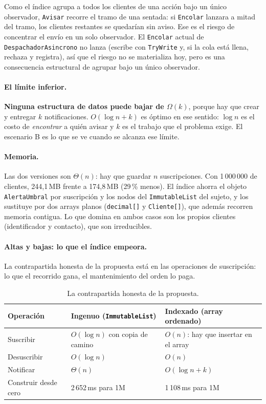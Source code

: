 Como el índice agrupa a todos los clientes de una acción bajo un único observador,
\texttt{Avisar} recorre el tramo de una sentada: si \texttt{Encolar} lanzara a mitad del
tramo, los clientes restantes se quedarían sin aviso. Ese es el riesgo de concentrar el
envío en un solo observador. El \texttt{Encolar} actual de
\texttt{DespachadorAsincrono} no lanza (escribe con \texttt{TryWrite} y, si la cola está
llena, rechaza y registra), así que el riesgo no se materializa hoy, pero es una
consecuencia estructural de agrupar bajo un único observador.

\paragraph{El límite inferior.}
\textbf{Ninguna estructura de datos puede bajar de $\Omega(k)$}, porque hay que crear y
entregar $k$ notificaciones. $O(\log n + k)$ es óptimo en ese sentido: $\log n$ es el costo
de \emph{encontrar} a quién avisar y $k$ es el trabajo que el problema exige. El escenario B
es lo que se ve cuando se alcanza ese límite.

\paragraph{Memoria.}
Las dos versiones son $\Theta(n)$: hay que guardar $n$ suscripciones. Con 1\,000\,000 de
clientes, 244,1\,MB frente a 174,8\,MB (29\,\% menos). El índice ahorra el objeto
\texttt{AlertaUmbral} por suscripción y los nodos del \texttt{ImmutableList} del sujeto, y
los sustituye por dos arrays planos (\texttt{decimal[]} y \texttt{Cliente[]}), que además
recorren memoria contigua. Lo que domina en ambos casos son los propios clientes
(identificador y contacto), que son irreducibles.

\paragraph{Altas y bajas: lo que el índice empeora.}
La contrapartida honesta de la propuesta está en las operaciones de suscripción: lo que el
recorrido gana, el mantenimiento del orden lo paga.

\begin{table}[H]
\centering
\small
\begin{tabular}{lll}
\toprule
\textbf{Operación} & \textbf{Ingenuo (\texttt{ImmutableList})} & \textbf{Indexado (array ordenado)} \\
\midrule
Suscribir & $O(\log n)$ con copia de camino & $O(n)$: hay que insertar en el array \\
Desuscribir & $O(\log n)$ & $O(n)$ \\
Notificar & $\Theta(n)$ & $O(\log n + k)$ \\
Construir desde cero & 2\,652\,ms para 1M & 1\,108\,ms para 1M \\
\bottomrule
\end{tabular}
\caption{La contrapartida honesta de la propuesta.}
\end{table}

